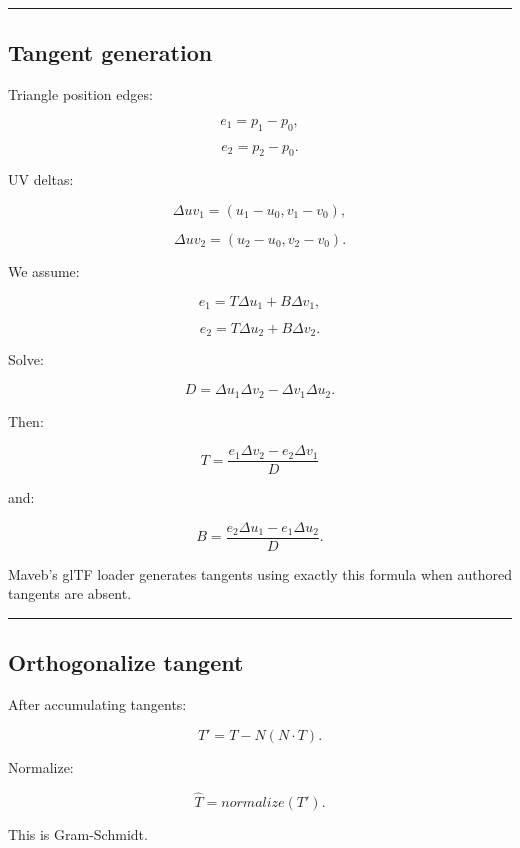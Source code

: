 \begin{center}\rule{0.5\linewidth}{0.5pt}\end{center}

\subsection{Tangent generation}\label{04-visual-computing-ii-ch041-tangent-generation}

\hypertarget{04-visual-computing-ii-ch041-tangent-generation}{}

Triangle position edges:

\[
e_1=p_1-p_0,
\]

\[
e_2=p_2-p_0.
\]

UV deltas:

\[
\Delta uv_1=
(u_1-u_0,v_1-v_0),
\]

\[
\Delta uv_2=
(u_2-u_0,v_2-v_0).
\]

We assume:

\[
e_1=
T\Delta u_1+
B\Delta v_1,
\]

\[
e_2=
T\Delta u_2+
B\Delta v_2.
\]

Solve:

\[
D=
\Delta u_1\Delta v_2
-
\Delta v_1\Delta u_2.
\]

Then:

\[
\boxed{
T=
\frac{
e_1\Delta v_2-
e_2\Delta v_1
}{D}
}
\]

and:

\[
\boxed{
B=
\frac{
e_2\Delta u_1-
e_1\Delta u_2
}{D}.
}
\]

Maveb's glTF loader generates tangents using exactly this formula when authored tangents are absent.

\begin{center}\rule{0.5\linewidth}{0.5pt}\end{center}

\subsection{Orthogonalize tangent}\label{04-visual-computing-ii-ch041-orthogonalize-tangent}

\hypertarget{04-visual-computing-ii-ch041-orthogonalize-tangent}{}

After accumulating tangents:

\[
T'
=
T-N(N\cdot T).
\]

Normalize:

\[
\boxed{
\hat T=
normalize(T').
}
\]

This is Gram-Schmidt.

